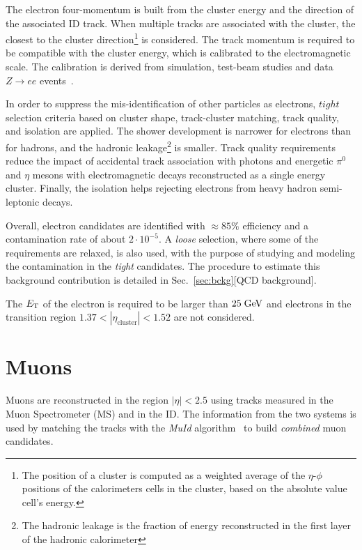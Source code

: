 The electron four-momentum is built from the cluster energy
and the direction of the associated ID track.
When multiple tracks are associated with the cluster, the closest
to the cluster direction\footnote{The position of a cluster 
is computed as a weighted average of the $\eta$-$\phi$ positions 
of the calorimeters cells in the cluster, based on the absolute 
value cell's energy.} is considered.
The track momentum is required to be compatible with the cluster energy,
which is calibrated to the electromagnetic scale. The calibration is
derived from simulation, test-beam studies and data $Z\to ee$ 
events~\cite{elecalib}.

In order to suppress the mis-identification of other particles  
as electrons, $tight$ selection criteria based on cluster shape, 
track-cluster matching, track quality, and isolation are applied.
The shower development is narrower for electrons than for hadrons, and
the hadronic leakage\footnote{The hadronic leakage is the fraction of 
energy reconstructed in the first layer of the hadronic calorimeter}
is smaller. Track quality requirements reduce the impact of accidental 
track association with photons and energetic $\pi^0$ and $\eta$ mesons
with electromagnetic decays reconstructed as a single energy cluster.
Finally, the isolation helps rejecting electrons from heavy hadron 
semi-leptonic decays.

Overall, electron candidates are identified with \mbox{$\approx{}85\%$} 
efficiency and a contamination rate of about \mbox{$2\cdot{}10^{-5}$}.
A {\it loose} selection, where some of the requirements are relaxed, 
is also used, with the purpose of studying and modeling the contamination
in the {\it tight} candidates. The procedure to estimate this background
contribution is detailed in Sec.~\ref{sec:bckg}[QCD background].

The $\mbox{\ensuremath{E_{\mathrm{T}}}}$ of the electron is required to be larger than \mbox{$25 \; \mathrm{GeV}{}$}
and electrons in the transition region $1.37<|\eta_{\mathrm{cluster}}|<1.52$
are not considered.

\section{Muons}
\label{sec:muons}

Muons are reconstructed in the region $|\eta|<2.5$ using tracks measured in the 
Muon Spectrometer (MS) and in the ID.
The information from the two systems is used by matching
the tracks with the {\it MuId} algorithm~\cite{muidalgo} to build 
{\it combined} muon candidates.

